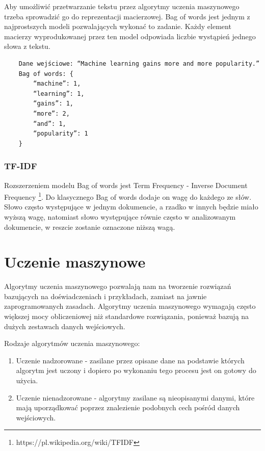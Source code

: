 Aby umożliwić przetwarzanie tekstu przez algorytmy uczenia maszynowego trzeba sprowadzić go do reprezentacji macierzowej. Bag of words jest jednym z najprostszych modeli pozwalających wykonać to zadanie. Każdy element macierzy wyprodukowanej przez ten model odpowiada liczbie wystąpień jednego słowa z tekstu.

\begin{verbatim}
    Dane wejściowe: “Machine learning gains more and more popularity.”
    Bag of words: { 
        “machine”: 1, 
        “learning”: 1, 
        “gains”: 1, 
        “more”: 2, 
        “and”: 1, 
        “popularity”: 1 
    }
\end{verbatim}

\subsubsection{TF-IDF}

Rozszerzeniem modelu Bag of words jest Term Frequency - Inverse Document Frequency \footnote{https://pl.wikipedia.org/wiki/TFIDF}. Do klasycznego Bag of words dodaje on wagę do każdego ze słów. Słowo często występujące w jednym dokumencie, a rzadko w innych będzie miało wyższą wagę, natomiast słowo występujące równie często w analizowanym dokumencie, w reszcie zostanie oznaczone niższą wagą.


\section{Uczenie maszynowe}
\label{sec:uczenieMaszynowe}

Algorytmy uczenia maszynowego pozwalają nam na tworzenie rozwiązań bazujących na doświadczeniach i przykładach, zamiast na jawnie zaprogramowanych zasadach. Algorytmy uczenia maszynowego wymagają często większej mocy obliczeniowej niż standardowe rozwiązania, ponieważ bazują na dużych zestawach danych wejściowych. 

Rodzaje algorytmów uczenia maszynowego:

\begin{enumerate}
    \item Uczenie nadzorowane - zasilane przez opisane dane na podstawie których algorytm jest uczony i dopiero po wykonaniu tego procesu jest on gotowy do użycia.

    \item Uczenie nienadzorowane - algorytmy zasilane są nieopisanymi danymi, które mają uporządkować poprzez znalezienie podobnych cech pośród danych wejściowych.
\end{enumerate}

